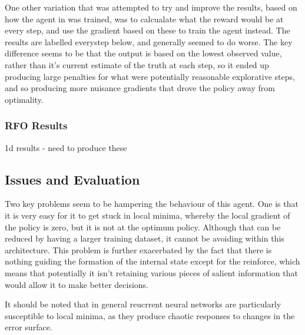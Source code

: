 One other variation that was attempted to try and improve the results, based on how the agent in \cite{RVA} was trained, was to calcualate what the reward would be at every step, and use the gradient based on these to train the agent instead. The results are labelled everystep below, and generally seemed to do worse. The key difference seems to be that the output is based on the lowest observed value, rather than it's current estimate of the truth at each step, so it ended up producing large penalties for what were potentially reasonable explorative steps, and so producing more nuisance gradients that drove the policy away from optimality.

\subsubsection{RFO Results}
1d results  - need to produce these

\subsection{Issues and Evaluation}
Two key problems seem to be hampering the behaviour of this agent. One is that it is very easy for it to get stuck in local minima, whereby the local gradient of the policy is zero, but it is not at the optimum policy. Although that can be reduced by having a larger training dataset, it cannot be avoiding within this architecture. This problem is further exacerbated by the fact that there is nothing guiding the formation of the internal state except for the reinforce, which means that potentially it isn't retaining various pieces of salient information that would allow it to make better decisions.

It should be noted that in general reucrrent neural networks are particularly susceptible to local minima, as they produce chaotic responses to changes in the error surface. \cite{rnns} %


